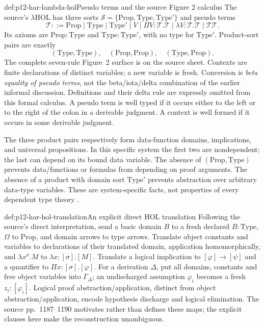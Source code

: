 \begin{hbdefinition}{def:p12-har-lambda-hol}{Pseudo terms and the source Figure 2 calculus}
The source's \(\lambda\mathrm{HOL}\) has three sorts
\(\mathcal S=\{\mathrm{Prop},\mathrm{Type},\mathrm{Type}'\}\)
and pseudo terms
\[
 \mathcal T::=\mathrm{Prop}\mid\mathrm{Type}\mid\mathrm{Type}'
    \mid V\mid\Pi V:\mathcal T.\mathcal T
    \mid\lambda V:\mathcal T.\mathcal T\mid\mathcal T\mathcal T.
\]
Its axioms are \(\mathrm{Prop}:\mathrm{Type}\) and
\(\mathrm{Type}:\mathrm{Type}'\), with no type for
\(\mathrm{Type}'\). Product-sort pairs are exactly
\[
 (\mathrm{Type},\mathrm{Type}),\quad
 (\mathrm{Prop},\mathrm{Prop}),\quad
 (\mathrm{Type},\mathrm{Prop}).
\]
The complete seven-rule Figure~2 surface is on the source sheet. Contexts
are finite declarations of distinct variables; a new variable is fresh.
Conversion is \emph{beta equality of pseudo terms}, not the
beta/iota/delta combination of the earlier informal discussion. Definitions
and their delta rule are expressly omitted from this formal calculus.
A pseudo term is well typed if it occurs either to the left or to the
right of the colon in a derivable judgment. A context is well formed if
it occurs in some derivable judgment.

The three product pairs respectively form data-function domains,
implications, and universal propositions. In this specific system the
first two are nondependent; the last can depend on its bound data variable.
The absence of \((\mathrm{Prop},\mathrm{Type})\) prevents
data/functions or formulas from depending on proof arguments. The absence
of a product with domain sort \(\mathrm{Type}'\) prevents
abstraction over arbitrary data-type variables. These are system-specific
facts, not properties of every dependent type theory
\cite[pp.~1185--1187, Definition~3.7; Fig.~2]{BarendregtGeuvers2001}.
\end{hbdefinition}

\begin{hbdefinition}{def:p12-har-hol-translation}{An explicit direct HOL translation}
Following the source's direct interpretation, send a basic domain \(B\)
to a fresh declared \(B:\mathrm{Type}\), \(\Omega\) to
\(\mathrm{Prop}\), and domain arrows to type arrows. Translate
object constants and variables to declarations of their translated domain,
application homomorphically, and
\(\lambda x^\sigma.M\) to \(\lambda x:[\sigma].[M]\).
Translate a logical implication to \([\varphi]\to[\psi]\)
and a quantifier to \(\Pi x:[\sigma].[\varphi]\).
For a derivation \(\Delta\), put all domains, constants and free
object variables into \(\Gamma_\Delta\); an undischarged assumption
\(\varphi_i\) becomes a fresh \(z_i:[\varphi_i]\).
Logical proof abstraction/application, distinct from object
abstraction/application, encode hypothesis discharge and logical
elimination. The source pp.~1187--1190 motivates rather than defines these
maps; the explicit clauses here make the reconstruction unambiguous.
\end{hbdefinition}

